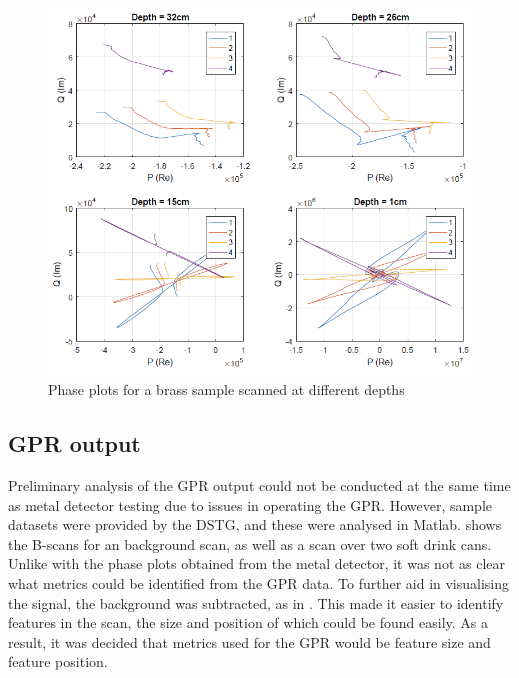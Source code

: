 \documentclass[main.tex]{subfiles}
\begin{document}
\begin{figure}[htp]
\includegraphics[width=\textwidth]{3-ConceptDesign/phaseDepth.PNG}
\centering
\caption{Phase plots for a brass sample scanned at different depths} 
\end{figure}

\subsection{GPR output}
Preliminary analysis of the GPR output could not be conducted at the same time as metal detector testing due to issues in operating the GPR. However, sample datasets were provided by the DSTG, and these were analysed in Matlab.  shows the B-scans for an background scan, as well as a scan over two soft drink cans. 
Unlike with the phase plots obtained from the metal detector, it was not as clear what metrics could be identified from the GPR data. To further aid in visualising the signal, the background was subtracted, as in . This made it easier to identify features in the scan, the size and position of which could be found easily. As a result, it was decided that metrics used for the GPR would be feature size and feature position.
\end{document}
